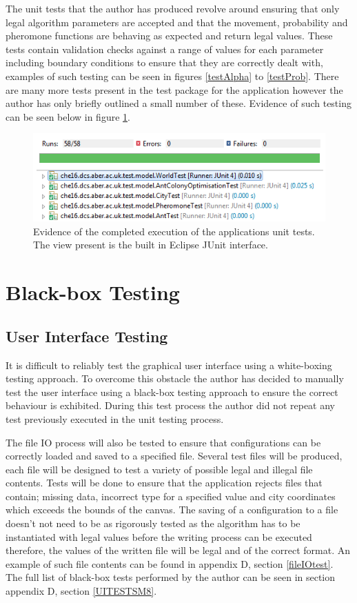 The unit tests that the author has produced revolve around ensuring that only legal algorithm parameters are accepted and that the movement, probability and pheromone functions are behaving as expected and return legal values. These tests contain validation checks against a range of values for each parameter including boundary conditions to ensure that they are correctly dealt with, examples of such testing can be seen in figures \ref{testAlpha} to \ref{testProb}. There are many more tests present in the test package for the application however the author has only briefly outlined a small number of these. Evidence of such testing can be seen below in figure \ref{testSS}.

\begin{figure}[H]
\centering
\includegraphics[scale=0.8]{Images/chapter6/testSS}
\caption[Unit Testing Summary]{Evidence of the completed execution of the applications unit tests. The view present is the built in Eclipse JUnit interface.}
\label{testSS}
\end{figure}

\section{Black-box Testing}
\subsection{User Interface Testing}

It is difficult to reliably test the graphical user interface using a white-boxing testing approach. To overcome this obstacle the author has decided to manually test the user interface using a black-box testing approach to ensure the correct behaviour is exhibited. During this test process the author did not repeat any test previously executed in the unit testing process.

The file IO process will also be tested to ensure that configurations can be correctly loaded and saved to a specified file. Several test files will be produced, each file will be designed to test a variety of possible legal and illegal file contents. Tests will be done to ensure that the application rejects files that contain; missing data, incorrect type for a specified value and city coordinates which exceeds the bounds of the canvas. The saving of a configuration to a file doesn’t not need to be as rigorously tested as the algorithm has to be instantiated with legal values before the writing process can be executed therefore, the values of the written file will be legal and of the correct format. An example of such file contents can be found in appendix D, section \ref{fileIOtest}. The full list of black-box tests performed by the author can be seen in section appendix D, section \ref{UITESTSM8}.

